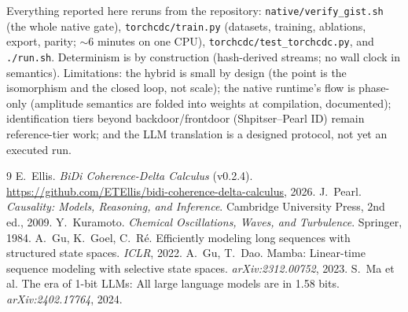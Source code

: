 \documentclass[11pt]{article}
\begin{document}
Everything reported here reruns from the repository:
\texttt{native/verify\_gist.sh} (the whole native gate),
\texttt{torchcdc/train.py} (datasets, training, ablations, export,
parity; $\sim$6 minutes on one CPU), \texttt{torchcdc/test\_torchcdc.py},
and \texttt{./run.sh}. Determinism is by construction (hash-derived
streams; no wall clock in semantics). Limitations: the hybrid is small by
design (the point is the isomorphism and the closed loop, not scale);
the native runtime's flow is phase-only (amplitude semantics are folded
into weights at compilation, documented); identification tiers beyond
backdoor/frontdoor (Shpitser--Pearl ID) remain reference-tier work; and
the LLM translation is a designed protocol, not yet an executed run.

\begin{thebibliography}{9}
 E.~Ellis. \emph{BiDi Coherence-Delta Calculus} (v0.2.4).
\url{https://github.com/ETEllis/bidi-coherence-delta-calculus}, 2026.
 J.~Pearl. \emph{Causality: Models, Reasoning, and
Inference}. Cambridge University Press, 2nd ed., 2009.
 Y.~Kuramoto. \emph{Chemical Oscillations, Waves, and
Turbulence}. Springer, 1984.
 A.~Gu, K.~Goel, C.~R\'e. Efficiently modeling long sequences
with structured state spaces. \emph{ICLR}, 2022.
 A.~Gu, T.~Dao. Mamba: Linear-time sequence modeling with
selective state spaces. \emph{arXiv:2312.00752}, 2023.
 S.~Ma et al. The era of 1-bit LLMs: All large language
models are in 1.58 bits. \emph{arXiv:2402.17764}, 2024.
\end{thebibliography}
\end{document}
